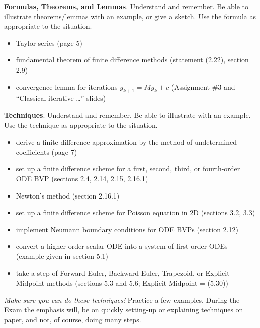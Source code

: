 \documentclass[12pt]{amsart}
\begin{document}
\bigskip

\noindent \textbf{Formulas, Theorems, and Lemmas}.  Understand and remember.  Be able to illustrate theorems/lemmas with an example, or give a sketch.  Use the formula as appropriate to the situation.
\begin{itemize}
\item Taylor series (page 5)
\item fundamental theorem of finite difference methods (statement (2.22), section 2.9)
\item convergence lemma for iterations $y_{k+1} = M y_k + c$ (Assignment \#3 and ``Classical iterative \dots'' slides)
\end{itemize}

\bigskip

\noindent \textbf{Techniques}.  Understand and remember.  Be able to illustrate with an example.  Use the technique as appropriate to the situation.
\begin{itemize}
\item derive a finite difference approximation by the method of undetermined coefficients (page 7)
\item set up a finite difference scheme for a first, second, third, or fourth-order ODE BVP (sections 2.4, 2.14, 2.15, 2.16.1)
\item Newton's method (section 2.16.1)
\item set up a finite difference scheme for Poisson equation in 2D (sections 3.2, 3.3)
\item implement Neumann boundary conditions for ODE BVPs (section 2.12)
\item convert a higher-order scalar ODE into a system of first-order ODEs (example given in section 5.1)
\item take a step of Forward Euler, Backward Euler, Trapezoid, or Explicit Midpoint methods (sections 5.3 and 5.6; Explicit Midpoint = (5.30))
\end{itemize}

\medskip
\noindent \emph{Make sure you can do these techniques!}  Practice a few examples.  During the Exam the emphasis will, be on quickly setting-up or explaining techniques on paper, and not, of course, doing many steps.
\vfill
\end{document}
